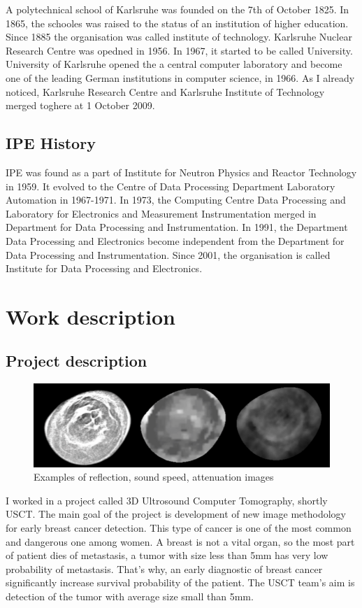 \documentclass[english]{article}
\begin{document}
A polytechnical school of Karlsruhe was founded on the 7th of October 1825. In 1865, the schooles was raised to the status of an institution of higher education. Since 1885 the organisation was called institute of technology. Karlsruhe Nuclear Research Centre was opedned in 1956. In 1967, it started to be called University. \\

University of Karlsruhe opened the a central computer laboratory and become one of the leading German institutions in computer science, in 1966. As I already noticed, Karlsruhe Research Centre and Karlsruhe Institute of Technology merged toghere at 1 October 2009.

\subsection{IPE History}

IPE was found as a part of Institute for Neutron Physics and Reactor Technology in 1959. It evolved to the Centre of Data Processing Department Laboratory Automation in 1967-1971. In 1973, the Computing Centre Data Processing and Laboratory for Electronics and Measurement Instrumentation merged in Department for Data Processing and Instrumentation. In 1991, the Department Data Processing and Electronics become independent from the Department for Data Processing and Instrumentation. Since 2001, the organisation is called Institute for Data Processing and Electronics.

\section{Work description}
\subsection{Project description}
\begin{figure}
\centerline{\includegraphics[scale=0.5]{internship_report/images.png}}
\caption{Examples of reflection, sound speed, attenuation images\label{fig:example}}
\end{figure}
I worked in a project called 3D Ultrosound Computer Tomography, shortly USCT. The main goal of the project is development of new image methodology for early breast cancer detection. This type of cancer is one of the most common and dangerous one among women. A breast is not a vital organ, so the most part of patient dies of metastasis, a tumor with size less than 5mm has very low probability of metastasis.  That's why, an early diagnostic of breast cancer significantly increase survival probability of the patient. The USCT team's aim is detection of the tumor with average size small than 5mm. 
\end{document}
